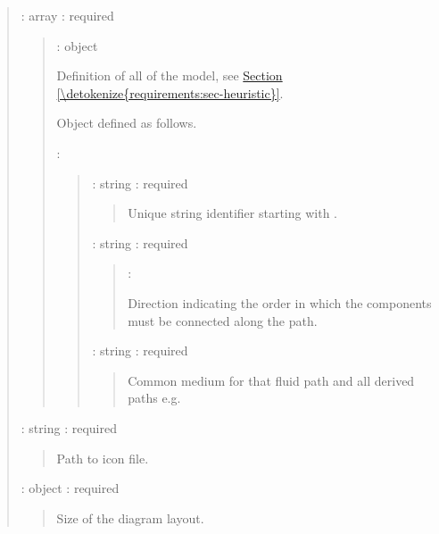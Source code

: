 \documentclass[letterpaper,10pt, openany,english]{sphinxmanual}
\begin{document}
\begin{quote}
 : array : required
\begin{quote}

 : object

\begin{DUlineblock}{0em}
\item[] Definition of all  of the model, see \hyperref[\detokenize{requirements:sec-heuristic}]{Section \ref{\detokenize{requirements:sec-heuristic}}}.
\item[] Object defined as follows.
\end{DUlineblock}

 : 
\begin{quote}

 : string : required
\begin{quote}

Unique string identifier starting with \sphinxcode{\sphinxupquote{\#}}.
\end{quote}

 : string : required
\begin{quote}

 : 

Direction indicating the order in which the components must be connected along the path.
\end{quote}

 : string : required
\begin{quote}

Common medium for that fluid path and all derived paths e.g. 
\end{quote}
\end{quote}
\end{quote}

 : string : required
\begin{quote}

Path to icon file.
\end{quote}

 : object : required
\begin{quote}

Size of the diagram layout.


\end{quote}
\end{quote}
\end{document}
